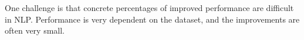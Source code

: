\documentclass{article}
\begin{document}
One challenge is that concrete percentages of improved performance are difficult in NLP. Performance is very dependent on the dataset, and the improvements are often very small. 

\end{document}
